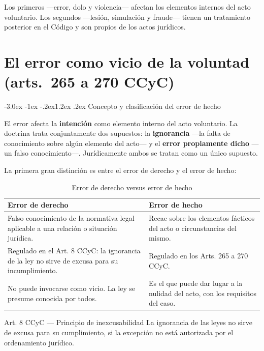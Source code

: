 \documentclass[12pt,oneside]{book}
\makeatletter
\renewcommand\section{\@startsection{section}{1}{\z@}%
  {-3.0ex \@plus -1ex \@minus -.2ex}{1.2ex \@plus .2ex}%
  {\normalfont\large\bfseries\color{acento}}}
\makeatother
\begin{document}
Los primeros ---error, dolo y violencia--- afectan los elementos internos del acto voluntario. Los segundos ---lesión, simulación y fraude--- tienen un tratamiento posterior en el Código y son propios de los actos jurídicos.


\chapter{El error como vicio de la voluntad (arts.~265 a 270 CCyC)}
\label{ch:error}

\section{Concepto y clasificación del error de hecho}

El error afecta la \textbf{intención} como elemento interno del acto voluntario. La doctrina trata conjuntamente dos supuestos: la \textbf{ignorancia} ---la falta de conocimiento sobre algún elemento del acto--- y el \textbf{error propiamente dicho} ---un falso conocimiento---. Jurídicamente ambos se tratan como un único supuesto.

La primera gran distinción es entre el error de derecho y el error de hecho:

\begin{table}[H]
\centering
\begin{tabularx}{\textwidth}{>{\raggedright\arraybackslash}X >{\raggedright\arraybackslash}X}
\toprule
\textbf{Error de derecho} & \textbf{Error de hecho} \\
\midrule
Falso conocimiento de la normativa legal aplicable a una relación o situación jurídica. & Recae sobre los elementos fácticos del acto o circunstancias del mismo. \\[6pt]
Regulado en el Art. 8 CCyC: la ignorancia de la ley no sirve de excusa para su incumplimiento. & Regulado en los Arts. 265 a 270 CCyC. \\[6pt]
No puede invocarse como vicio. La ley se presume conocida por todos. & Es el que puede dar lugar a la nulidad del acto, con los requisitos del caso. \\
\bottomrule
\end{tabularx}
\caption{Error de derecho versus error de hecho}
\end{table}

\begin{articulo}{Art. 8 CCyC --- Principio de inexcusabilidad}
La ignorancia de las leyes no sirve de excusa para su cumplimiento, si la excepción no está autorizada por el ordenamiento jurídico.
\end{articulo}
\end{document}
